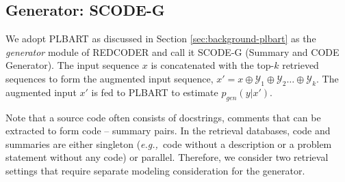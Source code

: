 \documentclass[11pt]{article}
\newcommand{\tool}{{REDCODER}\xspace}
\newcommand{\eg}{\textit{e.g.,}~}
\begin{document}
\subsection{Generator: SCODE-G}
\label{sec:method:gen}
We adopt PLBART as discussed in Section \ref{sec:background-plbart} as the {\em generator} module of \tool and call it SCODE-G (Summary and CODE Generator).
The input sequence $x$ is concatenated with the top-$k$ retrieved sequences 
to form the augmented input sequence, $x' = x \oplus \mathcal{Y}_{1}  \oplus  \mathcal{Y}_{2} \ldots \oplus \mathcal{Y}_{k}$.
The augmented input $x'$ is fed to PLBART to estimate $p_{gen}(y | x')$.


Note that a source code often consists of docstrings, comments that can be extracted to form code -- summary pairs.
In the retrieval databases, code and summaries are either singleton (\eg code without a description or a problem statement without any code) or parallel.
Therefore, we consider two retrieval settings that require separate modeling consideration for the generator.










\begin{table*}[!ht]
\centering
{}
        \caption{Dataset Statistics. Gen., and Sum. refers to code generation and summarization tasks respectively. 
        Summary denotes a natural language description paired with each code.
        For Concode, the input summary includes the corresponding environment variables and methods. All lengths are computed and averaged before tokenization.}
        \label{tab:dataset_task}
    \vspace{-2mm}
\end{table*} 
\end{document}
